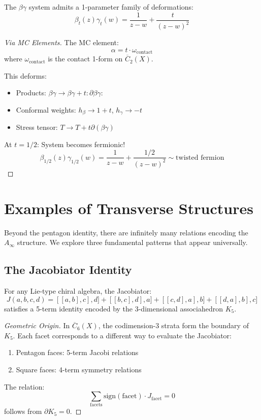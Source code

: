 \begin{theorem}
The $\beta\gamma$ system admits a 1-parameter family of deformations:
$$\beta_t(z)\gamma_t(w) = \frac{1}{z-w} + \frac{t}{(z-w)^2}$$
\end{theorem}

\begin{proof}[Via MC Elements]
The MC element:
$$\alpha = t \cdot \omega_{\text{contact}}$$
where $\omega_{\text{contact}}$ is the contact 1-form on $\overline{C}_2(X)$.

This deforms:
\begin{itemize}
\item Products: $\beta\gamma \to \beta\gamma + t:\partial\beta\gamma:$
\item Conformal weights: $h_\beta \to 1 + t$, $h_\gamma \to -t$
\item Stress tensor: $T \to T + t\partial(\beta\gamma)$
\end{itemize}

At $t = 1/2$: System becomes fermionic!
$$\beta_{1/2}(z)\gamma_{1/2}(w) = \frac{1}{z-w} + \frac{1/2}{(z-w)^2} \sim \text{twisted fermion}$$
\end{proof}


\section{Examples of Transverse Structures}

Beyond the pentagon identity, there are infinitely many relations encoding the $A_\infty$ structure. We explore three fundamental patterns that appear universally.

\subsection{The Jacobiator Identity}

\begin{theorem}
For any Lie-type chiral algebra, the Jacobiator:
$$J(a,b,c,d) = [[a,b],c],d] + [[b,c],d],a] + [[c,d],a],b] + [[d,a],b],c]$$
satisfies a 5-term identity encoded by the 3-dimensional associahedron $K_5$.
\end{theorem}

\begin{proof}[Geometric Origin]
In $\overline{C}_6(X)$, the codimension-3 strata form the boundary of $K_5$. Each facet corresponds to a different way to evaluate the Jacobiator:
\begin{enumerate}
\item Pentagon faces: 5-term Jacobi relations
\item Square faces: 4-term symmetry relations
\end{enumerate}

The relation:
$$\sum_{\text{facets}} \text{sign}(\text{facet}) \cdot J_{\text{facet}} = 0$$
follows from $\partial K_5 = 0$.
\end{proof}

